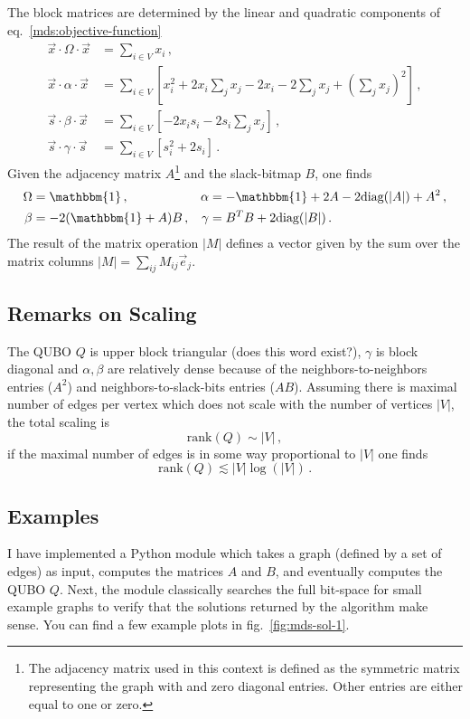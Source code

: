 \documentclass[]{article}
\begin{document}
The block matrices are determined by the linear and quadratic components of eq.~\eqref{mds:objective-function}
\begin{align}
	\vec x \cdot \Omega \cdot \vec x 
	&=
	\sum_{i \in V} x_i
	\, , \\
    \vec x \cdot \alpha \cdot \vec x
    &= 
    \sum_{i \in V} \left[
    	x_i^2 + 2 x_i \sum_j x_j  - 2 x_i - 2 \sum_j x_j + \left(\sum_j x_j\right)^2
	\right]
    \, , \\
    \vec s \cdot \beta \cdot \vec x
    &=
    \sum_{i \in V} \left[ - 2 x_i s_i - 2 s_i \sum_j x_j\right]
    \, , \\
    \vec s \cdot \gamma \cdot \vec s 
    &= 
    \sum_{i \in V} \left[s_i^2 + 2 s_i\right] \, .
\end{align}
Given the adjacency matrix $A$\footnote{The adjacency matrix used in this context is defined as the symmetric matrix representing the graph with and zero diagonal entries. Other entries are either equal to one or zero.} and the slack-bitmap $B$, one finds
\begin{align}
	\Omega &= \mathbbm{1} \, ,
    &
    \alpha &= - \mathbbm{1} + 2 A - 2 \text{diag}(|A|) + A^2
    \, , \\
    \beta &= -2 (\mathbbm{1} + A) B
    \, , &
     \gamma &= B^T B + 2 \text{diag}(|B|)
    \, .
\end{align}
The result of the matrix operation $|M|$ defines a vector given by the sum over the matrix columns $|M| = \sum_{ij} M_{ij} \vec e_j$.

\subsection{Remarks on Scaling}
The QUBO $Q$ is upper block triangular (does this word exist?), $\gamma$ is block diagonal and $\alpha, \beta$ are relatively dense because of the neighbors-to-neighbors entries ($A^2$) and neighbors-to-slack-bits entries ($A B$).
Assuming there is maximal number of edges per vertex which does not scale with the number of vertices $|V|$, the total scaling is
\begin{equation}
	\text{rank}(Q) \sim |V| \, ,
\end{equation}
if the maximal number of edges is in some way proportional to $|V|$ one finds
\begin{equation}
	\text{rank}(Q) \lesssim |V| \log(|V|) \, .
\end{equation}


\subsection{Examples}
I have implemented a Python module which takes a graph (defined by a set of edges) as input, computes the matrices $A$ and $B$, and eventually computes the QUBO $Q$.
Next, the module classically searches the full bit-space for small example graphs to verify that the solutions returned by the algorithm make sense.
You can find a few example plots in fig.~\ref{fig:mds-sol-1}.
\end{document}
